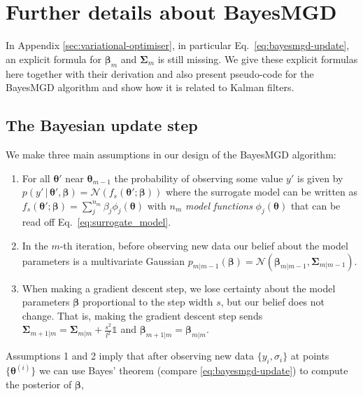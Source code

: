 \documentclass[aps,prb,twoside,superscriptaddress,longbibliography,nofootinbib,floatfix, notitlepage,twocolumn]{revtex4-1}
\renewcommand{\vec}[1]{\boldsymbol{#1}}
\begin{document}
{%




\section{Further details about BayesMGD}
\label{sec:bayesmgd-appendix}

In Appendix \ref{sec:variational-optimiser}, in particular Eq.~\eqref{eq:bayesmgd-update}, an explicit
formula for $\vec\beta_m$ and $\vec\Sigma_m$ is still missing. We give these explicit 
formulas here together with their derivation and also present pseudo-code for the
BayesMGD algorithm and show how it is related to Kalman filters.

\subsection{The Bayesian update step}
\label{sec:bayesmgd_update_step}
We make three main assumptions in our design of the BayesMGD algorithm:
\begin{enumerate}
    \item For all $\vec\theta'$ near $\vec\theta_{m-1}$ the probability of observing
    some value $y'$ is given by
    $p(y'\,|\,\vec\theta', \vec\beta) = \mathcal{N}(f_s(\vec\theta'; \vec\beta))$ where 
    the surrogate model can be written as
    $f_s(\vec\theta'; \vec\beta) = \sum_j^{n_m} \beta_j \phi_j(\vec\theta)$ with $n_m$ \emph{model functions} $\phi_j(\vec\theta)$ that can be read off Eq.~\ref{eq:surrogate_model}.
    \item In the $m$-th iteration, before observing new data our belief about the model 
    parameters is a multivariate Gaussian
    $p_{m|m-1}(\vec\beta) = \mathcal{N}(\vec\beta_{m|m-1}, \vec\Sigma_{m|m-1})$.
    \item When making a gradient descent step, we lose certainty about the 
    model parameters $\vec\beta$ proportional to the step width $s$, but our belief
    does not change. That is, making the gradient descent step sends
    $\vec\Sigma_{m+1|m} = \vec\Sigma_{m|m} + \frac{s^2}{l^2} \mathds{1}$ and
    $\vec{\beta}_{m+1|m} = \vec{\beta}_{m|m} $.
\end{enumerate}
%
Assumptions 1 and 2 imply that after observing new data $\{y_i,\sigma_i\}$ at points
$\{\vec\theta^{(i)}\}$ we can use Bayes' theorem (compare \eqref{eq:bayesmgd-update})
to compute the posterior of $\vec\beta$,
\begin{equation}
\begin{aligned}

\end{aligned}
\end{equation}}
\end{document}
